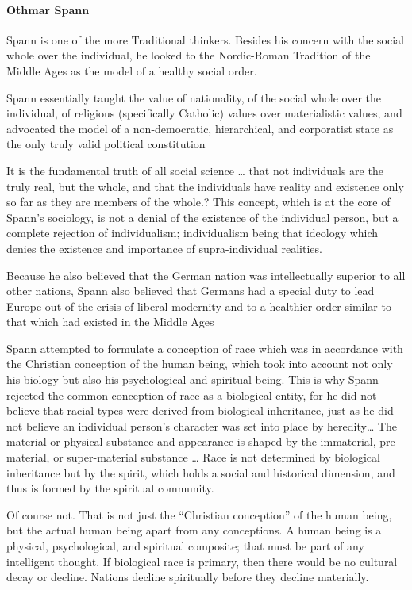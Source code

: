 \paragraph{Othmar Spann}
Spann is one of the more Traditional thinkers. Besides his concern with the social whole over the individual, he looked
to the Nordic-Roman Tradition of the Middle Ages as the model of a healthy social order.

\begin{quotex}
Spann essentially taught the value of nationality, of the social whole over the individual, of religious (specifically
Catholic) values over materialistic values, and advocated the model of a non-democratic, hierarchical, and corporatist
state as the only truly valid political constitution 

It is the fundamental truth of all social science … that not individuals are the truly real, but the whole, and that the
individuals have reality and existence only so far as they are members of the whole.? This concept, which is at the
core of Spann's sociology, is not a denial of the existence of the individual person, but a complete
rejection of individualism; individualism being that ideology which denies the existence and importance of
supra-individual realities. 

Because he also believed that the German nation was intellectually superior to all other nations, Spann also believed
that Germans had a special duty to lead Europe out of the crisis of liberal modernity and to a healthier order similar
to that which had existed in the Middle Ages 

Spann attempted to formulate a conception of race which was in accordance with the Christian conception of the human
being, which took into account not only his biology but also his psychological and spiritual being. This is why Spann
rejected the common conception of race as a biological entity, for he did not believe that racial types were derived
from biological inheritance, just as he did not believe an individual person's character was set into place
by heredity… The material or physical substance and appearance is shaped by the immaterial, pre-material, or
super-material substance … Race is not determined by biological inheritance but by the spirit, which holds a social and
historical dimension, and thus is formed by the spiritual community. 

\end{quotex}
Of course not. That is not just the “Christian conception” of the human being, but the actual human being apart from any
conceptions. A human being is a physical, psychological, and spiritual composite; that must be part of any intelligent
thought. If biological race is primary, then there would be no cultural decay or decline. Nations decline spiritually
before they decline materially.

